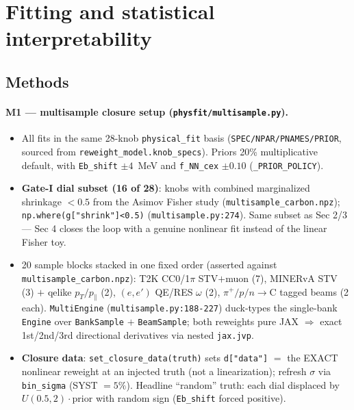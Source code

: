 \documentclass[aps,prd,reprint,superscriptaddress,nofootinbib,amsmath,amssymb,floatfix]{revtex4-1}
\begin{document}
\section{Fitting and statistical interpretability}
\label{sec:fitting}

\subsection{Methods}

\paragraph{M1 --- multisample closure setup (\texttt{physfit/multisample.py}).}
\begin{itemize}
  \item All fits in the same 28-knob \texttt{physical\_fit} basis (\texttt{SPEC/NPAR/PNAMES/PRIOR},
        sourced from \texttt{reweight\_model.knob\_specs}). Priors 20\% multiplicative default, with
        \texttt{Eb\_shift} $\pm4$~MeV and \texttt{f\_NN\_cex} $\pm0.10$ (\texttt{\_PRIOR\_POLICY}).
  \item \textbf{Gate-I dial subset (16 of 28)}: knobs with combined marginalized shrinkage $<0.5$ from the
        Asimov Fisher study (\texttt{multisample\_carbon.npz}); \texttt{np.where(g["shrink"]<0.5)}
        (\texttt{multisample.py:274}). Same subset as Sec 2/3 --- Sec 4 closes the loop with a genuine
        nonlinear fit instead of the linear Fisher toy.
  \item 20 sample blocks stacked in one fixed order (asserted against \texttt{multisample\_carbon.npz}):
        T2K CC0/1$\pi$ STV$+$muon (7), MINERvA STV (3) $+$ qelike $p_T/p_\parallel$ (2), $(e,e')$ QE/RES
        $\omega$ (2), $\pi^+/p/n\!\rightarrow\!$C tagged beams (2 each). \texttt{MultiEngine}
        (\texttt{multisample.py:188-227}) duck-types the single-bank \texttt{Engine} over
        \texttt{BankSample} $+$ \texttt{BeamSample}; both reweights pure JAX $\Rightarrow$ exact 1st/2nd/3rd
        directional derivatives via nested \texttt{jax.jvp}.
  \item \textbf{Closure data}: \texttt{set\_closure\_data(truth)} sets \texttt{d["data"]} $=$ the EXACT
        nonlinear reweight at an injected truth (not a linearization); refresh $\sigma$ via
        \texttt{bin\_sigma} (SYST $=5\%$). Headline ``random'' truth: each dial displaced by
        $U(0.5,2)\cdot\mathrm{prior}$ with random sign (\texttt{Eb\_shift} forced positive).
\end{itemize}
\end{document}

